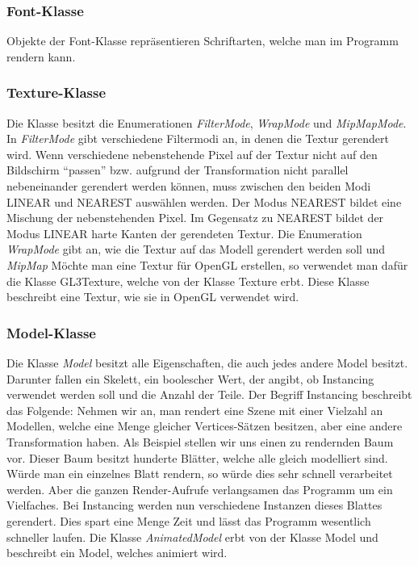 \subsubsection{Font-Klasse}
\label{Fontclass}
Objekte der Font-Klasse repräsentieren Schriftarten, welche man im Programm rendern kann.

\subsubsection{Texture-Klasse}
\label{Textureclass}
Die Klasse besitzt die Enumerationen \textit{FilterMode}, \textit{WrapMode} und \textit{MipMapMode}. In \textit{FilterMode} gibt verschiedene Filtermodi an, in denen die Textur gerendert wird.
Wenn verschiedene nebenstehende Pixel auf der Textur nicht auf den Bildschirm "`passen"' bzw. aufgrund der Transformation nicht parallel nebeneinander gerendert werden können, muss zwischen den beiden Modi LINEAR und NEAREST auswählen werden. Der Modus NEAREST bildet eine Mischung der nebenstehenden Pixel. 
Im Gegensatz zu NEAREST bildet der Modus LINEAR harte Kanten der gerendeten Textur.
Die Enumeration \textit{WrapMode} gibt an, wie die Textur auf das Modell gerendert werden soll und \textit{MipMap}
Möchte man eine Textur für OpenGL erstellen, so verwendet man dafür die Klasse GL3Texture, welche von der Klasse Texture erbt. Diese Klasse beschreibt eine Textur, wie sie in OpenGL verwendet wird.

\subsubsection{Model-Klasse}
\label{Modelclass}
Die Klasse \textit{Model} besitzt alle Eigenschaften, die auch jedes andere Model besitzt. Darunter fallen ein Skelett, ein boolescher Wert, der angibt, ob Instancing verwendet werden soll und die Anzahl der Teile.  
Der Begriff Instancing beschreibt das Folgende:
Nehmen wir an, man rendert eine Szene mit einer Vielzahl an Modellen, welche eine Menge gleicher Vertices-Sätzen  besitzen, aber eine andere Transformation haben.
Als Beispiel stellen wir uns einen zu rendernden Baum vor.
Dieser Baum besitzt hunderte Blätter, welche alle gleich modelliert sind. Würde man ein einzelnes Blatt rendern, so würde dies sehr schnell verarbeitet werden. Aber die ganzen Render-Aufrufe verlangsamen das Programm um ein Vielfaches. 
Bei Instancing werden nun verschiedene Instanzen dieses Blattes gerendert. Dies spart eine Menge Zeit und lässt das Programm wesentlich schneller laufen.
Die Klasse \textit{AnimatedModel} erbt von der Klasse Model und beschreibt ein Model, welches animiert wird.

